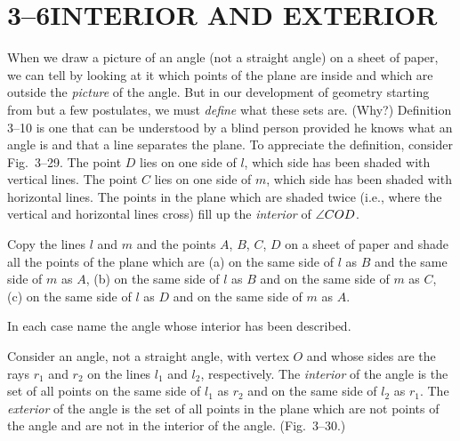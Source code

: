 \documentclass[11pt]{book}
\theoremstyle{bkplain}
\begin{document}
\section*{3--6\quad INTERIOR AND EXTERIOR}

When we draw a picture of an angle (not a straight angle) on a sheet of paper, we
can tell by looking at it which points of the plane are inside and which are
outside the \emph{picture} of the angle. But in our development of geometry
starting from but a few postulates, we must \emph{define} what these sets are.
(Why?) Definition 3--10 is one that can be understood by a blind person provided
he knows what an angle is and that a line separates the plane. To appreciate the
definition, consider Fig.~3--29. The point $D$ lies on one side of $l$, which
side has been shaded with vertical lines. The point $C$ lies on one side of $m$,
which side has been shaded with horizontal lines. The points in the plane which
are shaded twice (i.e., where the vertical and horizontal lines cross) fill up
the \emph{interior} of $\angle COD$.

\FIGIIITWENTYNINETHIRTY

\begin{exercisecols}
\begin{exlist}
\item Copy the lines $l$ and $m$ and the points $A$, $B$, $C$, $D$ on a sheet of
      paper and shade all the points of the plane which are (a) on the same side
      of $l$ as $B$ and the same side of $m$ as $A$, (b) on the same side of $l$
      as $B$ and on the same side of $m$ as $C$, (c) on the same side of $l$ as
      $D$ and on the same side of $m$ as $A$.
\item In each case name the angle whose interior has been described.
\end{exlist}
\end{exercisecols}

\begin{definition}
Consider an angle, not a straight angle, with vertex $O$ and whose sides are the
rays $r_1$ and $r_2$ on the lines $l_1$ and $l_2$, respectively. The
\emph{interior} of the angle is the set of all points on the same side of $l_1$
as $r_2$ and on the same side of $l_2$ as $r_1$. The \emph{exterior} of the angle
is the set of all points in the plane which are not points of the angle and are
not in the interior of the angle. (Fig.~3--30.)
\end{definition}
\end{document}

